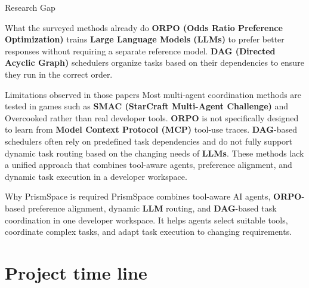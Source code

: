 \documentclass[aspectratio=169,10pt]{beamer}
\begin{document}

\begin{frame}{Research Gap}
\vspace{-0.05cm}
\begin{block}{What the surveyed methods already do}
\footnotesize
\textbf{ORPO (Odds Ratio Preference Optimization)} trains \textbf{Large Language Models (LLMs)} to prefer better responses without requiring a separate reference model. \textbf{DAG (Directed Acyclic Graph)} schedulers organize tasks based on their dependencies to ensure they run in the correct order.
\end{block}
\vspace{0.08cm}
\begin{block}{Limitations observed in those papers}
\footnotesize
Most multi-agent coordination methods are tested in games such as \textbf{SMAC (StarCraft Multi-Agent Challenge)} and Overcooked rather than real developer tools. \textbf{ORPO} is not specifically designed to learn from \textbf{Model Context Protocol (MCP)} tool-use traces. \textbf{DAG}-based schedulers often rely on predefined task dependencies and do not fully support dynamic task routing based on the changing needs of \textbf{LLMs}. These methods lack a unified approach that combines tool-aware agents, preference alignment, and dynamic task execution in a developer workspace.
\end{block}
\vspace{0.08cm}
\begin{block}{Why PrismSpace is required}
\footnotesize
PrismSpace combines tool-aware AI agents, \textbf{ORPO}-based preference alignment, dynamic \textbf{LLM} routing, and \textbf{DAG}-based task coordination in one developer workspace. It helps agents select suitable tools, coordinate complex tasks, and adapt task execution to changing requirements.
\end{block}
\end{frame}

\ifdefined\mainliteraturereview
\else
\section{Project time line}
\end{document}
